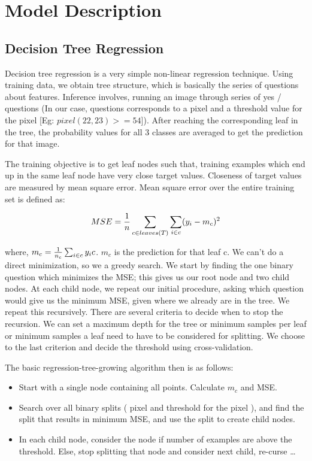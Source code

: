 \documentclass[10pt]{article}
\begin{document}
\section*{Model Description}

\subsection*{Decision Tree Regression}
Decision tree regression is a very simple non-linear regression technique. Using training data, we obtain tree structure, which is basically the series of questions about features. Inference involves, running an image through series of yes / questions (In our case, questions corresponds to a pixel and a threshold value for the pixel [Eg: $pixel(22, 23) >= 54$]). After reaching the corresponding leaf in the tree, the probability values for all 3 classes are averaged to get the prediction for that image.   

The training objective is to get leaf nodes such that, training examples which end up in the same leaf node have very close target values. Closeness of target values are measured by mean square error. Mean square error over the entire training set is defined as:

$$MSE = {1 \over n}  \sum_{c \in leaves(T)} \sum_{i \in c} (y_i - m_c)^2$$

where, $m_c =  {1 \over n_c} \sum_{i \in c} y_ic$. $m_c$ is the prediction for that leaf c. We can't do a direct minimization, so we a greedy search. We start by finding the one binary question which minimizes the MSE; this gives us our root node and two child nodes. At each child node, we repeat our initial procedure, asking which question would give us the minimum MSE, given where we already are in the tree. We repeat this recursively. There are several criteria to decide when to stop the recursion. We can set a maximum depth for the tree or minimum samples per leaf or minimum samples a leaf need to have to be considered for splitting. We choose to the last criterion and decide the threshold using cross-validation.

The basic regression-tree-growing algorithm then is as follows:

\begin{itemize}
  \item Start with a single node containing all points. Calculate $m_c$ and MSE.
  \item Search over all binary splits ( pixel and threshold for the pixel ), and find the split that results in minimum MSE, and use the split to create child nodes.
  \item In each child node, consider the node if number of examples are above the threshold. Else, stop splitting that node and consider next child, re-curse \ldots
\end{itemize}
\end{document}
